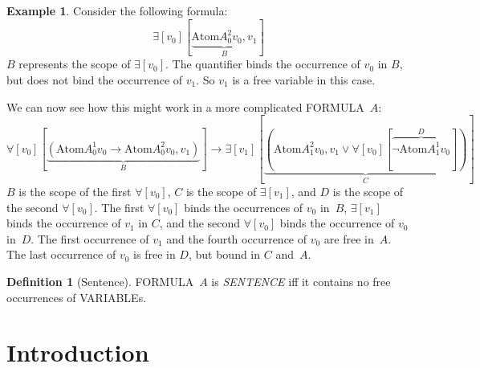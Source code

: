 \documentclass[10pt,a4paper]{article}
\newcommand*{\olup}[1]{\MakeUppercase{#1}}
\theoremstyle{plain}
\theoremstyle{definition}
\newtheorem{defn}[thm]{Definition}
\newtheorem{ex}[thm]{Example}
\theoremstyle{remark}
\newcommand*{\olfileid}[3]{}
\newcommand*{\olsection}[1]{\section*{#1}}
\providecommand{\lif}{\mathbin{\rightarrow}}
\providecommand{\lforall}{\mathord{\forall}}
\providecommand{\lexists}{\mathord{\exists}}
\providecommand{\Obj}{}
\providecommand{\Atom}{\mathrm{Atom}}
\begin{document}
\begin{ex}
Consider the following formula:
\[
\lexists[\Obj v_0][\underbrace{\Atom{\Obj A^2_0}{\Obj v_0,\Obj v_1}}_{B}] 
\]
$B$ represents the scope of $\lexists[\Obj v_0]$. 
The quantifier binds the occurrence of $\Obj v_0$ in $B$, but
does not bind the occurrence of $\Obj v_1$. So $\Obj v_1$ is
a free variable in this case.


We can now see how this might work in a more complicated 
\olup{formula}~$A$:
\[
\lforall[\Obj v_0][\underbrace{(\Atom{\Obj A^1_0}{\Obj v_0} \lif
    \Atom{\Obj A^2_0}{\Obj v_0, \Obj v_1})}_{B}] \lif \lexists[\Obj
  v_1][\underbrace{(\Atom{\Obj A^2_1}{\Obj v_0, \Obj v_1} \lor \lforall[\Obj v_0][\overbrace{\lnot \Atom{\Obj A^1_1}{\Obj v_0}}^{D}])}_{C}]
\]
$B$ is the scope of the first $\lforall[\Obj v_0]$, $C$ is the scope
of $\lexists[\Obj v_1]$, and $D$ is the scope of the second
$\lforall[\Obj v_0]$.  The first $\lforall[\Obj v_0]$ binds the
occurrences of $\Obj v_0$ in~$B$, $\lexists[\Obj v_1]$ binds the occurrence
of $\Obj v_1$ in $C$, and the second $\lforall[\Obj v_0]$ binds the
occurrence of $\Obj v_0$ in~$D$.  The first occurrence of $\Obj v_1$
and the fourth occurrence of $\Obj v_0$ are free in~$A$. The last
occurrence of $\Obj v_0$ is free in $D$, but bound in $C$ and~$A$.
\end{ex}

\begin{defn}[Sentence]
\olup{formula}~$A$ is  \emph{\olup{sentence}} iff it
contains no free occurrences of \olup{variable}s.
\end{defn}






\olfileid{fol}{syn}{its}

\olsection{Introduction}
\end{document}

